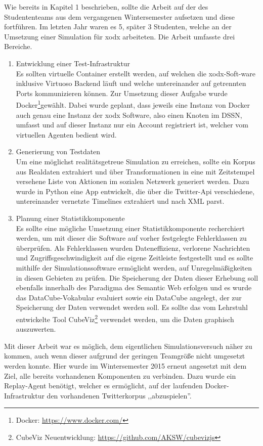 \documentclass{article}
\begin{document}
Wie bereits in Kapitel 1 beschrieben, sollte die Arbeit auf der des Studententeams aus dem vergangenen Wintersemester aufsetzen und diese fortführen. Im letzten Jahr waren es 5, später 3 Studenten, welche an der Umsetzung einer Simulation für xodx arbeiteten. Die Arbeit umfasste drei Bereiche.
\begin{enumerate}
	\item{Entwicklung einer Test-Infrastruktur\\
	Es sollten virtuelle Container erstellt werden, auf welchen die xodx-Soft-ware inklusive Virtuoso Backend läuft und welche untereinander auf getrennten Ports kommunizieren können. Zur Umsetzung dieser Aufgabe wurde Docker\footnote{Docker: \url{https://www.docker.com/}}gewählt. Dabei wurde geplant, dass jeweils eine Instanz von Docker auch genau eine Instanz der xodx Software, also einen Knoten im DSSN, umfasst und auf dieser Instanz nur ein Account registriert ist, welcher vom virtuellen Agenten bedient wird.}
	\item{Generierung von Testdaten\\
	Um eine möglichst realitätsgetreue Simulation zu erreichen, sollte ein Korpus aus Realdaten extrahiert und über Transformationen in eine mit Zeitstempel versehene Liste von Aktionen im sozialen Netzwerk generiert werden. Dazu wurde in Python eine App entwickelt, die über die Twitter-Api verschiedene, untereinander vernetzte Timelines extrahiert und nach XML parst.}
	\item{Planung einer Statistikkomponente\\
	Es sollte eine mögliche Umsetzung einer Statistikkomponente  recherchiert werden, um mit dieser die Software auf vorher festgelegte Fehlerklassen zu überprüfen. Als Fehlerklassen wurden Dateneffizienz, verlorene Nachrichten und Zugriffsgeschwindigkeit auf die eigene Zeitleiste festgestellt und es sollte mithilfe der Simulationssoftware ermöglicht werden, auf Unregelmäßigkeiten in diesen Gebieten zu prüfen. Die Speicherung der Daten dieser Erhebung soll ebenfalls innerhalb des Paradigma des Semantic Web erfolgen und es wurde das DataCube-Vokabular evaluiert sowie ein DataCube angelegt, der zur Speicherung der Daten verwendet werden soll. Es sollte das vom Lehrstuhl entwickelte Tool CubeViz\cite{cubeviz}\footnote{CubeViz Neuentwicklung: \url{https://github.com/AKSW/cubevizjs}} verwendet werden, um die Daten graphisch auszuwerten.}
\end{enumerate}
Mit dieser Arbeit war es möglich, dem eigentlichen Simulationsversuch näher zu kommen, auch wenn dieser aufgrund der geringen Teamgröße nicht umgesetzt werden konnte. Hier wurde im Wintersemester 2015 erneut angesetzt mit dem Ziel, alle bereits vorhandenen Komponenten zu verbinden. Dazu wurde ein Replay-Agent benötigt, welcher es ermöglicht, auf der laufenden Docker-Infrastruktur den vorhandenen Twitterkorpus ,,abzuspielen''.\\
\end{document}
